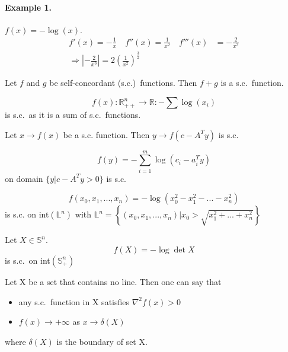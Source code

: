 \paragraph{Example 1.} $f(x) = -\log{(x)}$. 
\begin{align*}
f'(x) = -\frac{1}{x} \quad f''(x) = \frac{1}{x^2} \quad f'''(x) & = -\frac{2}{x^3} \\
\Rightarrow \left|-\frac{2}{x^3}\right| = 2 \left(\frac{1}{x^2}\right)^\frac{3}{2}
\end{align*}

\begin{property}
Let $f$ and $g$ be self-concordant (s.c.)\ functions. Then $f+g$ is a s.c.\ function.
\end{property}

\begin{example}
\begin{leftbar}
$$f(x) : \mathbb{R}_{++}^n \rightarrow \mathbb{R} : -\sum \log{(x_i)}$$ is s.c.\ as it is a sum of s.c.\ functions.
\end{leftbar}
\end{example}

\begin{property}
Let $x \rightarrow f(x)$ be a s.c. function. Then $y \rightarrow f(c-A^Ty)$ is s.c.\
\end{property}

\begin{example}
\begin{leftbar}
$$f(y) = - \sum\limits_{i=1}^m \log{(c_i-a_i^Ty)}$$ on domain $\{y|c-A^Ty > 0\}$ is s.c.\
\end{leftbar}
\end{example}

\begin{example}
\begin{leftbar}
$$f(x_0,x_1,...,x_n) = -\log{(x_0^2-x_1^2-...-x_n^2)}$$ is s.c. on int$(\mathbb{L}^n)$ with $\mathbb{L}^n = \left\{(x_0,x_1,...,x_n) | x_0 > \sqrt{x_1^2+...+x_n^2}\right\}$
\end{leftbar}
\end{example}

\begin{example}
\begin{leftbar}
Let $X \in \mathbb{S}^n$.
$$f(X) = -\log{\det{X}}$$
is s.c.\ on int$(\mathbb{S}_+^n)$
\end{leftbar}
\end{example}

\begin{property}
Let X be a set that contains no line. Then one can say that
\begin{itemize}
\item any s.c.\ function in X satisfies $\nabla^2 f(x) > 0$
\item $f(x) \rightarrow + \infty$ as $x \rightarrow \delta(X)$
\end{itemize}
where $\delta(X)$ is the boundary of set X.
\end{property}


